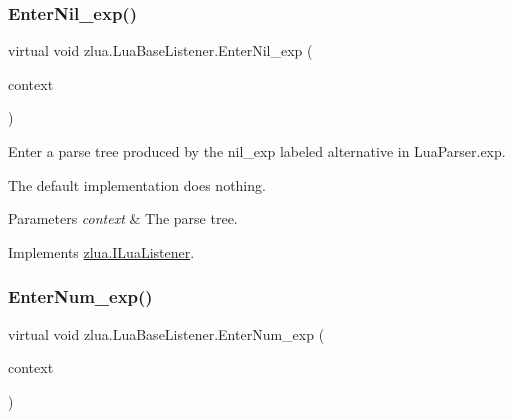 \subsubsection{\texorpdfstring{Enter\+Nil\+\_\+exp()}{EnterNil\_exp()}}
{\footnotesize\ttfamily virtual void zlua.\+Lua\+Base\+Listener.\+Enter\+Nil\+\_\+exp (\begin{DoxyParamCaption}\item[{\mbox{[}\+Not\+Null\mbox{]} \mbox{\hyperlink{classzlua_1_1_lua_parser_1_1_nil__exp_context}{Lua\+Parser.\+Nil\+\_\+exp\+Context}}}]{context }\end{DoxyParamCaption})\hspace{0.3cm}{\ttfamily [virtual]}}



Enter a parse tree produced by the {\ttfamily nil\+\_\+exp} labeled alternative in Lua\+Parser.\+exp. 

The default implementation does nothing.


\begin{DoxyParams}{Parameters}
{\em context} & The parse tree.\\
\hline
\end{DoxyParams}


Implements \mbox{\hyperlink{interfacezlua_1_1_i_lua_listener_aafcaca4386184948c08ead3b5dbba3be}{zlua.\+I\+Lua\+Listener}}.

\mbox{\label{classzlua_1_1_lua_base_listener_a76fcc42fe090e80443a7f08477fbf19f}} 
\subsubsection{\texorpdfstring{Enter\+Num\+\_\+exp()}{EnterNum\_exp()}}
{\footnotesize\ttfamily virtual void zlua.\+Lua\+Base\+Listener.\+Enter\+Num\+\_\+exp (\begin{DoxyParamCaption}\item[{\mbox{[}\+Not\+Null\mbox{]} \mbox{\hyperlink{classzlua_1_1_lua_parser_1_1_num__exp_context}{Lua\+Parser.\+Num\+\_\+exp\+Context}}}]{context }\end{DoxyParamCaption})\hspace{0.3cm}{\ttfamily [virtual]}}



